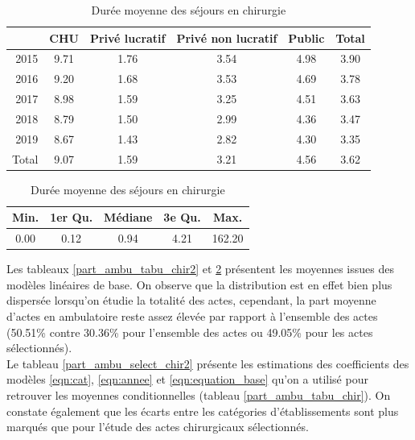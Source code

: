 \begin{table}[!ht]
\centering
\caption{Durée moyenne des séjours en chirurgie} 
\label{dms_tabu_chir2}
\begin{tabular}{r|cccc|c}
  \hline
 & CHU & Privé lucratif & Privé non lucratif & Public & Total \\ 
  \hline
2015 & 9.71 & 1.76 & 3.54 & 4.98 & 3.90 \\ 
  2016 & 9.20 & 1.68 & 3.53 & 4.69 & 3.78 \\ 
  2017 & 8.98 & 1.59 & 3.25 & 4.51 & 3.63 \\ 
  2018 & 8.79 & 1.50 & 2.99 & 4.36 & 3.47 \\ 
  2019 & 8.67 & 1.43 & 2.82 & 4.30 & 3.35 \\ 
  \hline
  Total & 9.07 & 1.59 & 3.21 & 4.56 & 3.62 \\ 
   \hline
\end{tabular}

\bigskip

\begin{tabular}{ccccc}
  \hline
Min. & 1er Qu. & Médiane & 3e Qu. & Max. \\ 
  \hline
0.00 & 0.12 & 0.94 & 4.21 & 162.20 \\ 
   \hline
\end{tabular}
\end{table}

Les tableaux \ref{part_ambu_tabu_chir2} et \ref{dms_tabu_chir2} présentent les moyennes issues des modèles linéaires de base. On observe que la distribution est en effet bien plus dispersée lorsqu'on étudie la totalité des actes, cependant, la part moyenne d'actes en ambulatoire reste assez élevée par rapport à l'ensemble des actes (50.51\% contre 30.36\% pour l'ensemble des actes ou 49.05\% pour les actes sélectionnés).\\

Le tableau \ref{part_ambu_select_chir2} présente les estimations des coefficients des modèles \ref{eqn:cat}, \ref{eqn:annee} et \ref{eqn:equation_base} qu'on a utilisé pour retrouver les moyennes conditionnelles (tableau \ref{part_ambu_tabu_chir}). On constate également que les écarts entre les catégories d'établissements sont plus marqués que pour l'étude des actes chirurgicaux sélectionnés.



